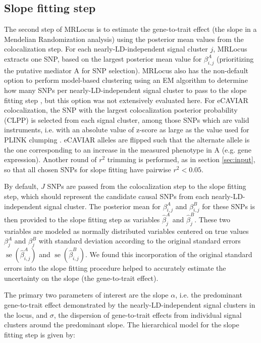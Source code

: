\documentclass[11pt]{article}
\DeclareMathOperator{\se}{\textrm{se}}
\begin{document}
\subsection{Slope fitting step} \label{sec:slope}

The second step of MRLocus is to estimate the gene-to-trait effect
(the slope in a Mendelian Randomization analysis) using the posterior
mean values from the colocalization step. For each
nearly-LD-independent signal cluster $j$, MRLocus extracts one SNP,
based on the largest posterior mean value for $\beta_{i,j}^A$
(prioritizing the putative mediator A for SNP selection).
MRLocus also has the non-default option to perform model-based
clustering using an EM algorithm to determine how many SNPs per
nearly-LD-independent signal cluster to pass to the slope fitting step
\citep{mclust}, but this option was not extensively evaluated here.
For eCAVIAR colocalization, the SNP with the largest colocalization
posterior probability (CLPP) is selected from each signal cluster,
among those SNPs which are valid instruments, i.e. with an absolute
value of z-score as large as the value used for PLINK clumping
\citep{plink}.  eCAVIAR alleles are flipped such that the alternate
allele is the one corresponding to an increase in the measured
phenotype in A (e.g. gene expression). Another round of $r^2$ trimming
is performed, as in section \ref{sec:input}, so that all chosen SNPs
for slope fitting have pairwise $r^2 < 0.05$.

By default, $J$ SNPs are passed from the colocalization step to the
slope fitting step, which should represent the candidate causal SNPs
from each nearly-LD-independent signal cluster. The posterior mean for
$\beta_{i,j}^A$ and $\beta_{i,j}^B$ for these SNPs is then provided to
the slope fitting step as variables $\widehat{\beta}_j^A$ and
$\widehat{\beta}_j^B$. These two variables
are modeled as normally distributed variables centered on
true values $\beta_j^A$ and $\beta_j^B$
with standard deviation according to the original standard errors
$\se(\widehat{\beta}_{i,j}^A)$ and
$\se(\widehat{\beta}_{i,j}^B)$. We found this incorporation of the
original standard errors into the slope fitting procedure helped to
accurately estimate the uncertainty on the slope (the gene-to-trait
effect). 

The primary two parameters of interest are the slope $\alpha$, 
i.e. the predominant gene-to-trait effect demonstrated by the
nearly-LD-independent signal clusters in the locus, and $\sigma$,
the dispersion of gene-to-trait effects from individual signal clusters
around the predominant slope.
The hierarchical model for the slope fitting step is given by:
\end{document}

